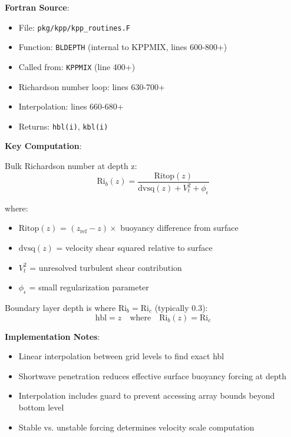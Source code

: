 \documentclass[11pt]{article}
\begin{document}
\textbf{Fortran Source}:
\begin{itemize}
    \item File: \verb|pkg/kpp/kpp_routines.F|
    \item Function: \verb|BLDEPTH| (internal to KPPMIX, lines 600-800+)
    \item Called from: \verb|KPPMIX| (line 400+)
    \item Richardson number loop: lines 630-700+
    \item Interpolation: lines 660-680+
    \item Returns: \verb|hbl(i)|, \verb|kbl(i)|
\end{itemize}

\textbf{Key Computation}:

Bulk Richardson number at depth z:
\begin{equation}
\text{Ri}_b(z) = \frac{\text{Ritop}(z)}{\text{dvsq}(z) + V_t^2 + \phi_\epsilon}
\end{equation}

where:
\begin{itemize}
    \item $\text{Ritop}(z)$ = $(z_{\text{ref}} - z) \times$ buoyancy difference from surface
    \item $\text{dvsq}(z)$ = velocity shear squared relative to surface
    \item $V_t^2$ = unresolved turbulent shear contribution
    \item $\phi_\epsilon$ = small regularization parameter
\end{itemize}

Boundary layer depth is where $\text{Ri}_b = \text{Ri}_c$ (typically 0.3):
\begin{equation}
\text{hbl} = z \quad \text{where} \quad \text{Ri}_b(z) = \text{Ri}_c
\end{equation}

\textbf{Implementation Notes}:
\begin{itemize}
    \item Linear interpolation between grid levels to find exact hbl
    \item Shortwave penetration reduces effective surface buoyancy forcing at depth
    \item Interpolation includes guard to prevent accessing array bounds beyond bottom level
    \item Stable vs. unstable forcing determines velocity scale computation
\end{itemize}
\end{document}
